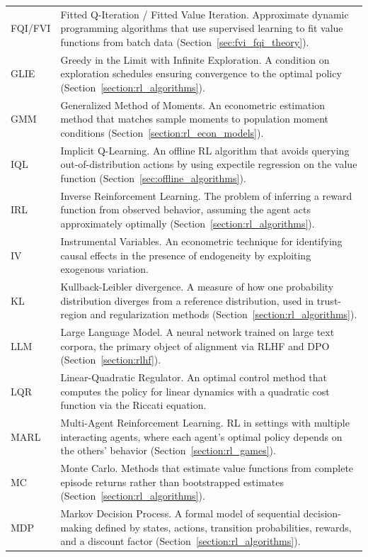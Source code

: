 \begin{longtable}{p{2.2cm} p{12cm}}
FQI/FVI & Fitted Q-Iteration / Fitted Value Iteration. Approximate dynamic programming algorithms that use supervised learning to fit value functions from batch data (Section~\ref*{sec:fvi_fqi_theory}). \\[4pt]
GLIE & Greedy in the Limit with Infinite Exploration. A condition on exploration schedules ensuring convergence to the optimal policy (Section~\ref*{section:rl_algorithms}). \\[4pt]
GMM & Generalized Method of Moments. An econometric estimation method that matches sample moments to population moment conditions (Section~\ref*{section:rl_econ_models}). \\[4pt]
IQL & Implicit Q-Learning. An offline RL algorithm that avoids querying out-of-distribution actions by using expectile regression on the value function (Section~\ref*{sec:offline_algorithms}). \\[4pt]
IRL & Inverse Reinforcement Learning. The problem of inferring a reward function from observed behavior, assuming the agent acts approximately optimally (Section~\ref*{section:rl_algorithms}). \\[4pt]
IV & Instrumental Variables. An econometric technique for identifying causal effects in the presence of endogeneity by exploiting exogenous variation. \\[4pt]
KL & Kullback-Leibler divergence. A measure of how one probability distribution diverges from a reference distribution, used in trust-region and regularization methods (Section~\ref*{section:rl_algorithms}). \\[4pt]
LLM & Large Language Model. A neural network trained on large text corpora, the primary object of alignment via RLHF and DPO (Section~\ref*{section:rlhf}). \\[4pt]
LQR & Linear-Quadratic Regulator. An optimal control method that computes the policy for linear dynamics with a quadratic cost function via the Riccati equation. \\[4pt]
MARL & Multi-Agent Reinforcement Learning. RL in settings with multiple interacting agents, where each agent's optimal policy depends on the others' behavior (Section~\ref*{section:rl_games}). \\[4pt]
MC & Monte Carlo. Methods that estimate value functions from complete episode returns rather than bootstrapped estimates (Section~\ref*{section:rl_algorithms}). \\[4pt]
MDP & Markov Decision Process. A formal model of sequential decision-making defined by states, actions, transition probabilities, rewards, and a discount factor (Section~\ref*{section:rl_algorithms}). \\[4pt]

\end{longtable}
